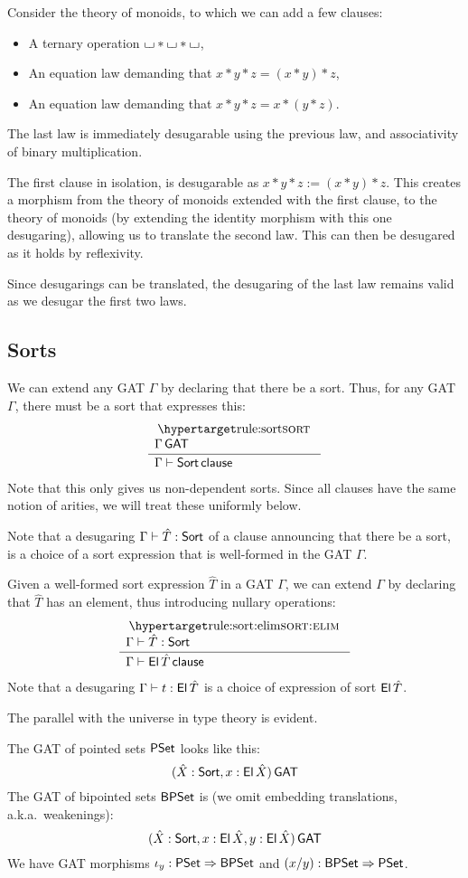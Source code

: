 \documentclass[a4paper]{article}
\begin{document}
\begin{example}
	Consider the theory of monoids, to which we can add a few clauses:
	\begin{itemize}
		\item A ternary operation ${\llcorner\hspace{-.4ex}\lrcorner} * {\llcorner\hspace{-.4ex}\lrcorner} * {\llcorner\hspace{-.4ex}\lrcorner}$,
		\item An equation law demanding that $x * y * z = (x * y) * z$,
		\item An equation law demanding that $x * y * z = x * (y * z)$.
	\end{itemize}
	The last law is immediately desugarable using the previous law, and associativity of binary multiplication.
	
	The first clause in isolation, is desugarable as $x * y * z := (x * y) * z$.
	This creates a morphism from the theory of monoids extended with the first clause, to the theory of monoids (by extending the identity morphism with this one desugaring), allowing us to translate the second law.
	This can then be desugared as it holds by reflexivity.
	
	Since desugarings can be translated, the desugaring of the last law remains valid as we desugar the first two laws.
\end{example}

\subsection{Sorts}
We can extend any GAT $\Gamma$ by declaring that there be a sort.
Thus, for any GAT $\Gamma$, there must be a sort that expresses this:
\[
	\inferencel{sort}{
		\Gamma \GAT
	}{
		\Gamma \sez \Sort \clause
	}{}
\]
Note that this only gives us non-dependent sorts.
Since all clauses have the same notion of arities, we will treat these uniformly below.

Note that a desugaring $\Gamma \vdash \hat T : {\mathsf{Sort}}$ of a clause announcing that there be a sort, is a choice of a sort expression that is well-formed in the GAT $\Gamma$.

Given a well-formed sort expression $\hat T$ in a GAT $\Gamma$, we can extend $\Gamma$ by declaring that $\hat T$ has an element, thus introducing nullary operations:
\[
	\inferencel{sort:elim}{
		\Gamma \sez \hat T : \Sort
	}{
		\Gamma \sez \El\,\hat T \clause
	}{}
\]
Note that a desugaring $\Gamma \vdash t : {\mathsf{El}}\,\hat T$ is a choice of expression of sort ${\mathsf{El}}\,\hat T$.

The parallel with the universe in type theory is evident.
\begin{example}
	The GAT of pointed sets $\mathsf{PSet}$ looks like this:
	\[
		(\hat X : {\mathsf{Sort}}, x : {\mathsf{El}}\,\hat X) \,\mathsf{GAT}
	\]
	The GAT of bipointed sets $\mathsf{BPSet}$ is (we omit embedding translations, a.k.a.\ weakenings):
	\[
		(\hat X : {\mathsf{Sort}}, x : {\mathsf{El}}\,\hat X, y : {\mathsf{El}}\,\hat X) \,\mathsf{GAT}
	\]
	We have GAT morphisms $\iota_y : \mathsf{PSet} \Rightarrow \mathsf{BPSet}$ and $(x/y) : \mathsf{BPSet} \Rightarrow \mathsf{PSet}$.
\end{example}
\end{document}

